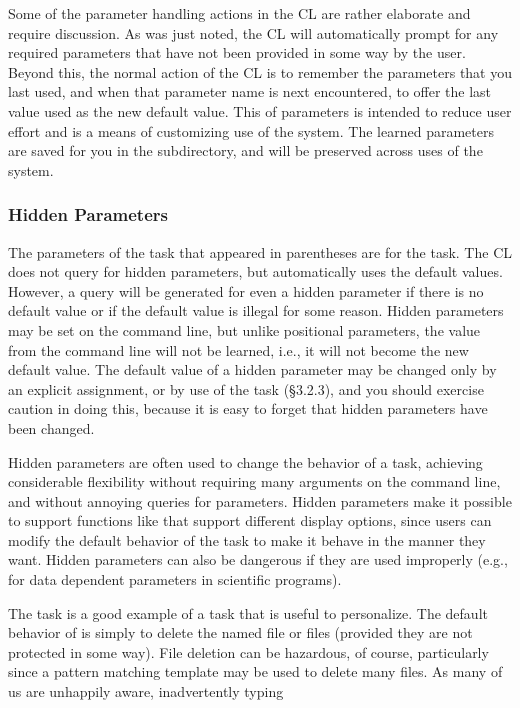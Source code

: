 Some of the parameter handling actions in the CL are rather elaborate
and require discussion.  As was just noted, the CL will automatically
prompt for any required parameters that have not been provided in some
way by the user.  Beyond this, the normal action of the CL is to
remember the parameters that you last used, and when that parameter
name is next encountered, to offer the last value used as the new
default value.  This  of parameters is intended
to reduce user effort and is a means of customizing use of the system.
The learned parameters are saved for you in the 
subdirectory, and will be preserved across uses of the system.

\subsubsection{Hidden Parameters}

\ppind
The parameters of the  task that appeared in 
parentheses are  for the task.
The CL does not query for hidden parameters, but automatically
uses the default values.  However, a query will be generated for 
even a hidden parameter if there is no
default value or if the default value is illegal for some reason.
Hidden parameters may be set on the command line, but unlike positional
parameters, the value from the command line will not be learned, i.e., it will
not become the new default value.  The default value of a hidden parameter may
be changed only by an explicit assignment, or by use of the 
task (\S 3.2.3), and you should exercise caution in doing this,
because it is easy to forget that hidden parameters have been changed.

Hidden parameters are often used to change the behavior of a task,
achieving considerable flexibility without requiring many arguments on the
command line, and without annoying queries for parameters.  Hidden parameters
make it possible to support functions like  that
support different display options,  since users can modify
the default behavior of the task to make it behave in the manner they want.
Hidden parameters can also be dangerous if they are used improperly
(e.g., for data dependent parameters in scientific programs).

The  task is a good example of a task that is useful to
personalize.  The default behavior of  is simply to delete
the named file or files (provided they are not protected in some way).
File deletion can be hazardous, of course, particularly since a pattern
matching template may be used to delete many files. As many of us are unhappily
aware, inadvertently typing

